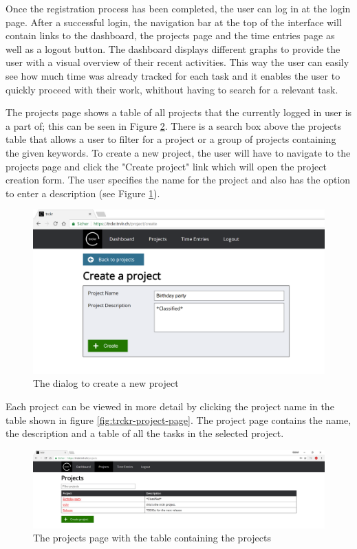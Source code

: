 \documentclass[bibliography=totoc, listof=totocnumbered]{scrartcl}
\begin{document}
Once the registration process has been completed, the user can log in at the
login page. After a successful login, the navigation bar at the top of the
interface will contain links to the dashboard, the projects page and the time
entries page as well as a logout button. The dashboard displays different graphs
to provide the user with a visual overview of their recent activities. This way
the user can easily see how much time was already tracked for each task and it
enables the user to quickly proceed with their work, whithout having to search
for a relevant task.

The projects page shows a table of all projects that the currently logged in
user is a part of; this can be seen in Figure \ref{fig:trckr-projects-table}.
There is a search box above the projects table that allows a user to filter for
a project or a group of projects containing the given keywords. To create a new
project, the user will have to navigate to the projects page and click the
"Create project" link which will open the project creation form. The user
specifies the name for the project and also has the option to enter a
description (see Figure \ref{fig:trckr-create-project}).

\begin{figure}[h]
    \includegraphics[width=\textwidth]{trckr-create-project}
    \caption{The dialog to create a new project}
    \label{fig:trckr-create-project}
\end{figure}

Each project can be viewed in more detail by clicking the project name in the
table shown in figure \ref{fig:trckr-project-page}. The project page contains
the name, the description and a table of all the tasks in the selected project.

\begin{figure}[h]
    \includegraphics[width=\textwidth]{trckr-projects-table}
    \caption{The projects page with the table containing the projects}
    \label{fig:trckr-projects-table}
\end{figure}
\end{document}
